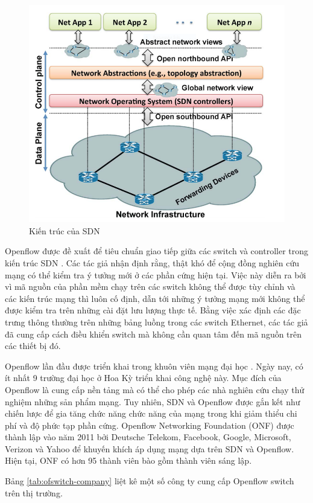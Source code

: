 \begin{figure}[ht!]
	\centering
	\includegraphics[width=0.75\linewidth]{fig/sdn-infrastructure.png}
	\caption{Kiến trúc của SDN \cite{11-Kreutz}}
	\label{fig:sdn-infrastructure}
\end{figure}

Openflow \cite{13-McKeown} được đề xuất để tiêu chuẩn giao tiếp giữa các switch và controller trong kiến trúc SDN \cite{14-Lara}. Các tác giả nhận định rằng, thật khó để cộng đồng nghiên cứu mạng có thể kiểm tra ý tưởng mới ở các phần cứng hiện tại. Việc này diễn ra bởi vì mã nguồn của phần mềm chạy trên các switch không thể được tùy chỉnh và các kiến trúc mạng thì luôn cố định, dẫn tới những ý tưởng mạng mới không thể được kiểm tra trên những cài đặt lưu lượng thực tế. Bằng việc xác định các đặc trưng thông thường trên những bảng luồng trong các switch Ethernet, các tác giả đã cung cấp cách điều khiển switch mà không cần quan tâm đến mã nguồn trên các thiết bị đó.
	
Openflow lần đầu được triển khai trong khuôn viên mạng đại học \cite{13-McKeown}. Ngày nay, có ít nhất 9 trường đại học ở Hoa Kỳ triển khai công nghệ này. Mục đích của Openflow là cung cấp nền tảng mà có thể cho phép các nhà nghiên cứu chạy thử nghiệm những sản phẩm mạng. Tuy nhiên, SDN và Openflow được gắn kết như chiến lược để gia tăng chức năng chức năng của mạng trong khi giảm thiểu chi phí và độ phức tạp phần cứng. Openflow Networking Foundation (ONF) được thành lập vào năm 2011 bởi Deutsche Telekom, Facebook, Google, Microsoft, Verizon và Yahoo để khuyến khích áp dụng mạng dựa trên SDN và Openflow. Hiện tại, ONF có hơn 95 thành viên bào gồm thành viên sáng lập.

Bảng \ref{tab:ofswitch-company} liệt kê một số công ty cung cấp Openflow switch trên thị trường.

